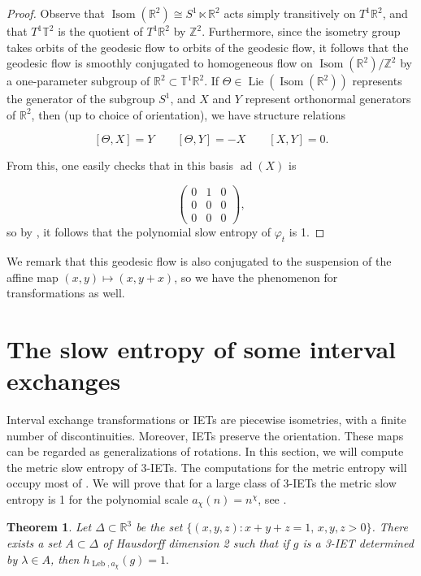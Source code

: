\documentclass[oneside]{amsart}
\theoremstyle{plain}
\newtheorem{THM}{Theorem}[section]
\theoremstyle{definition}
\DeclareMathOperator{\Leb}{Leb}
\newcommand{\<}{\langle}
\renewcommand{\>}{\rangle}
\newcommand{\R}{\mathbb{R}}
\newcommand{\Z}{\mathbb{Z}}
\newcommand{\T}{\mathbb{T}}
\newcommand{\Isom}{\operatorname{Isom}}
\newcommand{\Lie}{\operatorname{Lie}}
\newcommand{\ad}{\operatorname{ad}}
\renewcommand{\|}{|\!|} %
\begin{document}
\begin{proof}
    Observe that $\Isom(\R^2) \cong S^1 \ltimes \R^2$ acts simply transitively on $T^1\R^2$, and that $T^1\T^2$ is the quotient of $T^1\R^2$ by $\Z^2$. Furthermore, since the isometry group takes orbits of the geodesic flow to orbits of the geodesic flow, it follows that the geodesic flow is smoothly conjugated to homogeneous flow on $\Isom(\R^2) / \Z^2$ by a one-parameter subgroup of $\R^2 \subset \T^1\R^2$. If $\Theta \in \Lie(\Isom(\R^2))$ represents the generator of the subgroup $S^1$, and $X$ and $Y$ represent orthonormal generators of $\R^2$, then (up to choice of orientation), we have structure relations

    \[ [\Theta,X] = Y \qquad [\Theta,Y] = -X \qquad [X,Y] = 0. \]

    From this, one easily checks that in this basis $\ad(X)$ is
    
    \[\begin{pmatrix}
        0 & 1 & 0 \\ 0 & 0 & 0 \\ 0 & 0 & 0
    \end{pmatrix},\] so by \cite{ParabolicFlows}, it follows that the polynomial slow entropy of $\varphi_t$ is 1.
\end{proof}

We remark that this geodesic flow is also conjugated to the suspension of the affine map $(x,y) \mapsto (x,y+x)$, so we have the phenomenon for transformations as well.






\section{The slow entropy of some interval exchanges}
\label{sec:iets}
Interval exchange transformations or  IETs are piecewise isometries, with a finite number of discontinuities. Moreover, IETs preserve the orientation. These maps can be regarded as generalizations of rotations.
In this section, we will compute the metric slow entropy of 3-IETs. The computations for the metric entropy will occupy most of . We will prove that for a large class of 3-IETs the metric slow entropy is 1 for the polynomial scale $a_\chi(n)=n^\chi$, see . 

\begin{THM}
    \label{thm:IETslowentropy}
    Let $\Delta \subset \R^3$ be the set $\{(x,y,z):x+y+z=1,\,x,y,z>0\}$. There exists a set $A\subset \Delta$ of Hausdorff dimension 2 such that if $g$ is a 3-IET determined by $\lambda \in A$, then $h_{\Leb,a_{\chi}}(g) = 1.$ 
\end{THM}
\end{document}

